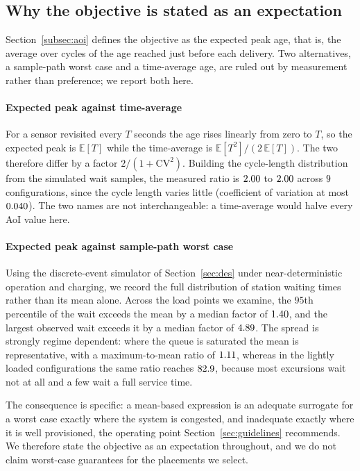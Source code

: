\subsection{Why the objective is stated as an expectation}
\label{sec:metric-gap}

Section~\ref{subsec:aoi} defines the objective as the expected peak age, that is, the
average over cycles of the age reached just before each delivery. Two alternatives, a sample-path worst case and a time-average age, are ruled out by
measurement rather than preference; we report both here.

\paragraph{Expected peak against time-average}
For a sensor revisited every $T$ seconds the age rises linearly from zero to $T$, so the
expected peak is $\mathbb{E}[T]$ while the time-average is
$\mathbb{E}[T^{2}]/(2\,\mathbb{E}[T])$. The two therefore differ by a factor
$2/(1+\mathrm{CV}^{2})$. Building the cycle-length distribution from the simulated wait
samples, the measured ratio is $2.00$ to $2.00$ across
$9$ configurations, since the cycle length varies little (coefficient of
variation at most $0.040$). The two names are not interchangeable: a time-average would halve every AoI value
here.

\paragraph{Expected peak against sample-path worst case}

Using the discrete-event simulator of Section~\ref{sec:des} under near-deterministic
operation and charging, we record the full distribution of station waiting times rather
than its mean alone. Across the load points we examine, the $95$th percentile of the
wait exceeds the mean by a median factor of $1.40$, and the largest observed
wait exceeds it by a median factor of $4.89$. The spread is strongly regime
dependent: where the queue is saturated the mean is representative, with a
maximum-to-mean ratio of $1.11$, whereas in the lightly loaded configurations the
same ratio reaches $82.9$, because most excursions wait not at all and a few wait a
full service time.

The consequence is specific: a mean-based expression is an adequate surrogate for a
worst case exactly where the system is congested, and inadequate exactly where it is
well provisioned, the operating point Section~\ref{sec:guidelines} recommends. We therefore state the objective as an
expectation throughout, and we do not claim worst-case guarantees for the placements we
select.


